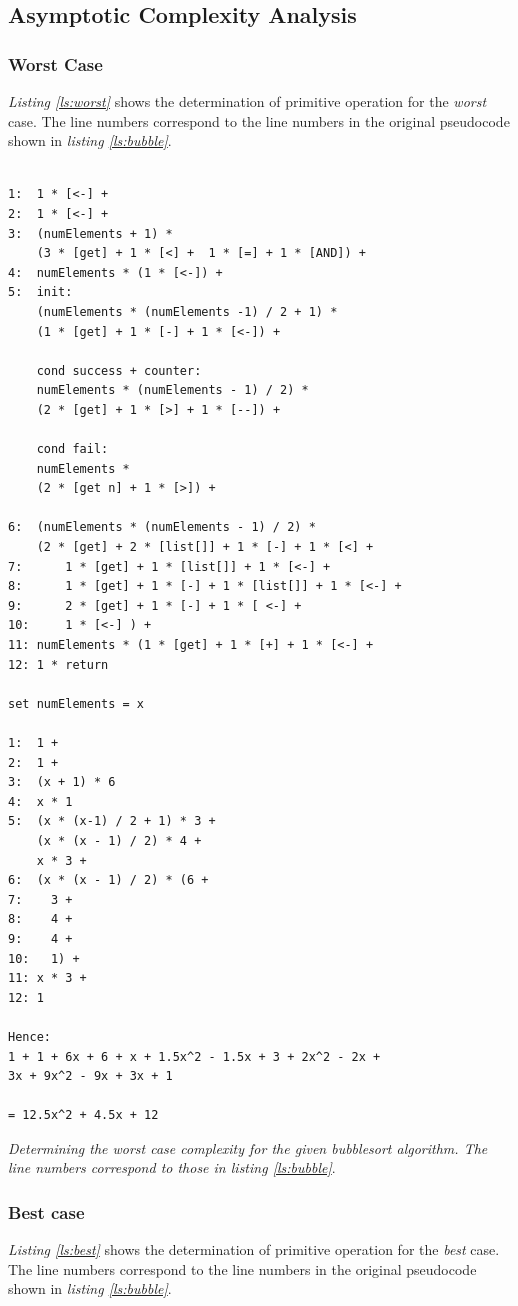 \documentclass[a4paper,11pt,twoside]{article}
\begin{document}
\subsection{Asymptotic Complexity Analysis}
\subsubsection{Worst Case}
\textit{Listing \ref{ls:worst}} shows the determination of primitive operation
for the \emph{worst} case. The line numbers correspond to the line numbers
in the original pseudocode shown in \textit{listing \ref{ls:bubble}}.

\begin{listing}
\begin{verbatim}

1:  1 * [<-] + 
2:  1 * [<-] + 
3:  (numElements + 1) * 
    (3 * [get] + 1 * [<] +  1 * [=] + 1 * [AND]) + 
4:  numElements * (1 * [<-]) +
5:  init:
    (numElements * (numElements -1) / 2 + 1) *
    (1 * [get] + 1 * [-] + 1 * [<-]) +
 
    cond success + counter: 
    numElements * (numElements - 1) / 2) *
    (2 * [get] + 1 * [>] + 1 * [--]) +

    cond fail:
    numElements * 
    (2 * [get n] + 1 * [>]) +

6:  (numElements * (numElements - 1) / 2) * 
    (2 * [get] + 2 * [list[]] + 1 * [-] + 1 * [<] + 
7:      1 * [get] + 1 * [list[]] + 1 * [<-] +
8:      1 * [get] + 1 * [-] + 1 * [list[]] + 1 * [<-] + 
9:      2 * [get] + 1 * [-] + 1 * [ <-] +
10:     1 * [<-] ) +
11: numElements * (1 * [get] + 1 * [+] + 1 * [<-] +
12: 1 * return

set numElements = x

1:  1 + 
2:  1 + 
3:  (x + 1) * 6  
4:  x * 1
5:  (x * (x-1) / 2 + 1) * 3 +
    (x * (x - 1) / 2) * 4 +
    x * 3 +
6:  (x * (x - 1) / 2) * (6 +
7:    3 + 
8:    4 +
9:    4 + 
10:   1) + 
11: x * 3 +
12: 1 

Hence:
1 + 1 + 6x + 6 + x + 1.5x^2 - 1.5x + 3 + 2x^2 - 2x + 
3x + 9x^2 - 9x + 3x + 1

= 12.5x^2 + 4.5x + 12

\end{verbatim}
\caption{\textit{Determining the \emph{worst case} complexity for the given
    \emph{bubblesort} algorithm. The line numbers correspond to those in 
listing \ref{ls:bubble}}.\label{ls:worst}}
\end{listing}

\subsubsection{Best case}
\textit{Listing \ref{ls:best}} shows the determination of primitive operation
for the \emph{best} case. The line numbers correspond to the line numbers
in the original pseudocode shown in \textit{listing \ref{ls:bubble}}.
\end{document}
